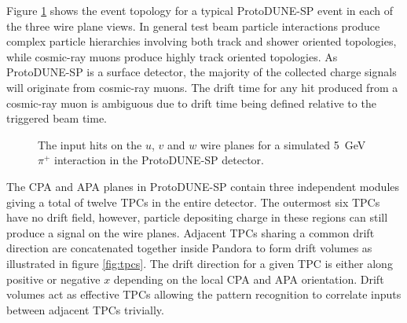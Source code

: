 Figure \ref{fig:inputhits} shows the event topology for a typical ProtoDUNE-SP event in each of the three wire plane views.  In general test beam particle interactions produce complex particle hierarchies involving both track and shower oriented topologies, while cosmic-ray muons produce highly track oriented topologies.  As ProtoDUNE-SP is a surface detector, the majority of the collected charge signals will originate from cosmic-ray muons.  The drift time for any hit produced from a cosmic-ray muon is ambiguous due to drift time being defined relative to the triggered beam time.

\begin{figure}
\centering
{}
\caption{The input hits on the \protect{} $u$, \protect{} $v$ and \protect{} $w$ wire planes for a simulated 5~GeV $\pi^{+}$ interaction in the ProtoDUNE-SP detector.}
\label{fig:inputhits}
\end{figure}

The CPA and APA planes in ProtoDUNE-SP contain three independent modules giving a total of twelve TPCs in the entire detector.  The outermost six TPCs have no drift field, however, particle depositing charge in these regions can still produce a signal on the wire planes.  Adjacent TPCs sharing a common drift direction are concatenated together inside Pandora to form drift volumes as illustrated in figure \ref{fig:tpcs}.  The drift direction for a given TPC is either along positive or negative $x$ depending on the local CPA and APA orientation.  Drift volumes act as effective TPCs allowing the pattern recognition to correlate inputs between adjacent TPCs trivially.

